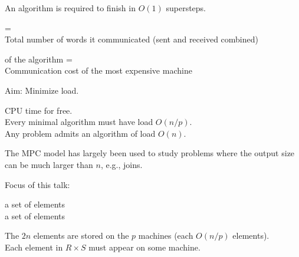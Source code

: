 \documentclass{beamer}
\def\vgap{\vspace{5mm}}
\begin{document}
\begin{frame}
\begin{small}
    
    \vgap 
    
    An algorithm is required to finish in $O(1)$ supersteps. 
    
    \vgap \pause 
    
     = \\
    Total number of words it communicated (sent and received combined) 
    
    \vgap \pause
    
     of the algorithm =  \\
    Communication cost of the most expensive machine 
    
    \vgap \pause 
    
    Aim: Minimize load. 
    
    \vgap \pause
    
    \begin{tcolorbox}[arc=0mm, colframe=blue!50!black, colback=blue!10!white] 
         CPU time for free. \\ \pause 
         Every minimal algorithm must have load $O(n/p)$. \\ \pause
         Any problem admits an algorithm of load $O(n)$. 
    \end{tcolorbox}

\end{small}
\end{frame}
\begin{frame}
\begin{small}
    
    \vgap 
    
    The MPC model has largely been used to study problems where the output size can be much larger than $n$, e.g., joins. 
    
    \vgap \pause 
    
    Focus of this talk:  \pause
    
    \vgap
    
     a set of   elements \\ 
     a set of   elements \\ 

    \vgap 
    
     The $2n$ elements are stored on the $p$ machines (each $O(n/p)$ elements). \\ 
     Each element in $R \times S$ must appear on some machine. 
\end{small}
\end{frame}
\end{document}
